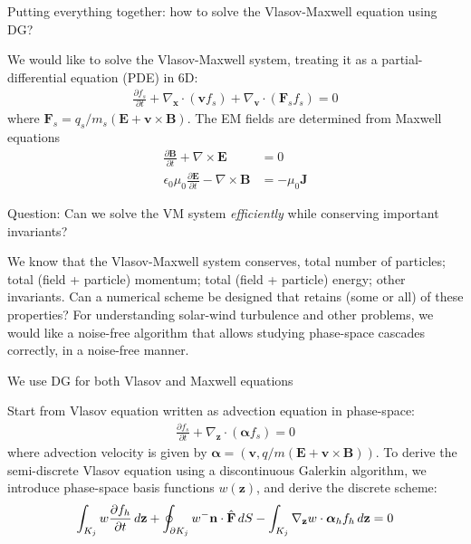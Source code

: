 \documentclass[pdf]{beamer}
\newcommand{\pfrac}[2]{\frac{\partial #1}{\partial #2}}
\newcommand{\mvec}[1]{\mathbf{#1}}
\newcommand{\gvec}[1]{\boldsymbol{#1}}
\newcommand{\gcs}{\nabla_{\mvec{x}}}
\newcommand{\gvs}{\nabla_{\mvec{v}}}
\newcommand{\gps}{\nabla_{\mvec{z}}}
\theoremstyle{definition}
\begin{document}
\begin{frame}{Putting everything together: how to solve the
    Vlasov-Maxwell equation using DG?}

  We would like to solve the Vlasov-Maxwell system, treating it as a
  partial-differential equation (PDE) in 6D:
  \begin{align*}
    \pfrac{f_s}{t} + \gcs\cdot (\mvec{v} f_s) + \gvs\cdot (\mvec{F}_s
    f_s) = 0
  \end{align*}
  where $\mvec{F}_s=q_s/m_s (\mvec{E}+\mvec{v}\times\mvec{B})$. The EM
  fields are determined from Maxwell equations
  \begin{align*}
    \frac{\partial \mvec{B}}{\partial t} + \nabla\times\mvec{E} &= 0 \\
    \epsilon_0\mu_0\frac{\partial \mvec{E}}{\partial t} -
    \nabla\times\mvec{B} &= -\mu_0\mvec{J}
  \end{align*}
\end{frame}

\begin{frame}{Question: Can we solve the VM system \emph{efficiently}
    while conserving important invariants?}

  We know that the Vlasov-Maxwell system conserves, total number of
  particles; total (field + particle) momentum; total (field +
  particle) energy; other invariants. Can a numerical scheme be
  designed that retains (some or all) of these properties?%
  \vskip0.1in%
  For understanding solar-wind turbulence and other problems, we would
  like a noise-free algorithm that allows studying phase-space
  cascades correctly, in a noise-free manner.%

\end{frame}


\begin{frame}{We use DG for both Vlasov and Maxwell equations}

  Start from Vlasov equation written as advection equation in
  phase-space:
  \begin{align*}
    \pfrac{f_s}{t} + \gps\cdot (\gvec{\alpha} f_s) = 0
  \end{align*}%
  where advection velocity is given by
  $\gvec{\alpha} = (\mvec{v}, q/m(\mvec{E}+\mvec{v}\times\mvec{B}))$.
  \vskip0.1in%
  To derive the semi-discrete Vlasov equation using a discontinuous
  Galerkin algorithm, we introduce phase-space basis functions
  $w(\mvec{z})$, and derive the discrete scheme:
  \begin{align*}
    \int_{K_j} w\pfrac{f_h}{t} \thinspace d\mvec{z} + 
    \oint_{\partial K_j}w^- \mvec{n}\cdot\hat{\mvec{F}}  \thinspace dS 
    - \int_{K_j} \gps w \cdot \gvec{\alpha}_h f_h \thinspace d\mvec{z} = 0 
  \end{align*}
\end{frame}
\end{document}

